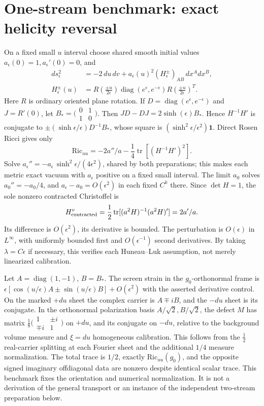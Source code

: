 \documentclass[11pt]{article}
\begin{document}
\section{One-stream benchmark: exact helicity reversal}\label{sec:rosen}
On a fixed small \(u\) interval choose shared smooth initial values \(a_\epsilon(0)=1,a_\epsilon'(0)=0\), and
\[
 \begin{aligned}
 ds_\epsilon^2&=-2\,du\,dv+a_\epsilon(u)^2 (H_\epsilon^\pm)_{AB}\,dx^A dx^B,\\
 H_\epsilon^\pm(u)&=R\!\left(\frac{\pm u}{2\epsilon}\right)
 \operatorname{diag}(e^\epsilon,e^{-\epsilon})R\!\left(\frac{\pm u}{2\epsilon}\right)^T .
 \end{aligned}
\]
Here \(R\) is ordinary oriented plane rotation. If \(D=\operatorname{diag}(e^\epsilon,e^{-\epsilon})\) and \(J=R'(0)\), let \(B_*=\bigl(\begin{smallmatrix}0&1\\1&0\end{smallmatrix}\bigr)\). Then \(JD-DJ=2\sinh(\epsilon)B_*\).
Hence \(H^{-1}H'\) is conjugate to \(\pm(\sinh\epsilon/\epsilon)D^{-1}B_*\), whose square is \((\sinh^2\epsilon/\epsilon^2)\mathbf1\). Direct Rosen Ricci gives only
\[
\mathrm{Ric}_{uu}=-2a''/a-\frac14\operatorname{tr}[(H^{-1}H')^2].
\]
Solve \(a_\epsilon''=-a_\epsilon\,\sinh^2\epsilon/(4\epsilon^2)\), shared by both preparations; this makes each metric exact vacuum with \(a_\epsilon\) positive on a fixed small interval. The limit \(a_0\) solves \(a_0''=-a_0/4\), and \(a_\epsilon-a_0=O(\epsilon^2)\) in each fixed \(C^k\) there. Since \(\det H=1\), the sole nonzero contracted Christoffel is
\[
H_{\rm contracted}^v=\frac12\operatorname{tr}[(a^2H)^{-1}(a^2H)']=2a'/a .
\]
Its difference is \(O(\epsilon^2)\), its derivative is bounded. The perturbation is \(O(\epsilon)\) in \(L^\infty\), with uniformly bounded first and \(O(\epsilon^{-1})\) second derivatives. By taking \(\lambda=C\epsilon\) if necessary, this verifies each Huneau--Luk assumption, not merely linearized calibration.

Let \(A=\operatorname{diag}(1,-1)\), \(B=B_*\). The screen strain in the \(g_0\)-orthonormal frame is \(\epsilon[\cos(u/\epsilon)A\pm\sin(u/\epsilon)B]+O(\epsilon^2)\) with the asserted derivative control. On the marked \(+du\) sheet the complex carrier is \(A\mp iB\), and the \(-du\) sheet is its conjugate. In the orthonormal polarization basis \(A/\sqrt2,B/\sqrt2\), the defect \(M\) has matrix \(\frac18\bigl(\begin{smallmatrix}1&\pm i\\\mp i&1\end{smallmatrix}\bigr)\) on \(+du\), and its conjugate on \(-du\), relative to the background volume measure and \(\xi=du\) homogeneous calibration. This follows from the \(\frac12\) real-carrier splitting at each Fourier sheet and the additional \(1/4\) measure normalization. The total trace is \(1/2\), exactly \(\mathrm{Ric}_{uu}(g_0)\), and the opposite signed imaginary offdiagonal data are nonzero despite identical scalar trace. This benchmark fixes the orientation and numerical normalization. It is not a derivation of the general transport or an instance of the independent two-stream preparation below.
\end{document}
